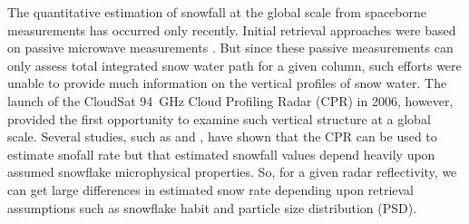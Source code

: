 The quantitative estimation of snowfall at the global scale from spaceborne measurements has occurred only recently. Initial retrieval approaches were based on passive microwave measurements \citep{skofronick-jackson_physical_2004,noh_development_2006}. But since these passive measurements can only assess total integrated snow water path for a given column, such efforts were unable to provide much information on the vertical profiles of snow water. 
The launch of the CloudSat \SI{94}{\giga\hertz} Cloud Profiling Radar (CPR) in 2006, however, provided the first opportunity to examine such vertical structure at a global scale. Several studies, such as \citet{matrosov_modeling_2007} and \citet{kulie_utilizing_2009}, have shown that the CPR can be used to estimate snofall rate but that estimated snowfall values depend heavily upon assumed snowflake microphysical properties. So, for a given radar reflectivity, we can get large differences in estimated snow rate depending upon retrieval assumptions such as snowflake habit and particle size distribution (PSD).
%

